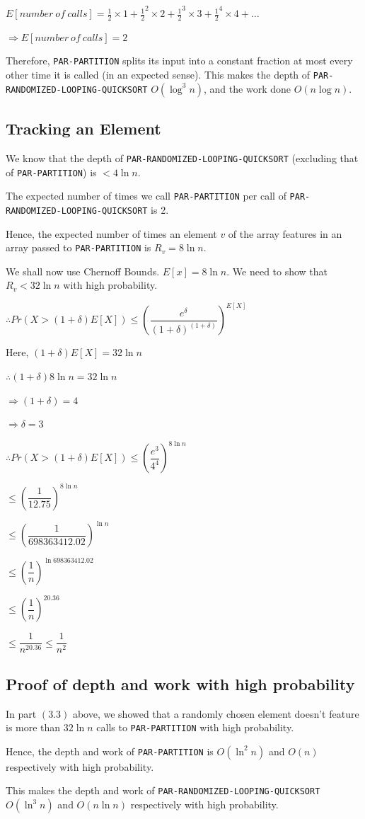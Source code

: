 \documentclass{article}
\begin{document}
$E[number\ of\ calls] = \frac{1}{2} \times 1 + \frac{1}{2}^2 \times 2 +
\frac{1}{2}^3 \times 3 + \frac{1}{2}^4 \times 4 + \ldots$

$\Rightarrow E[number\ of\ calls] = 2$

Therefore, \texttt{PAR-PARTITION} splits its input into a constant
fraction at most every other time it is called (in an expected
sense). This makes the depth of
\texttt{PAR-RANDOMIZED-LOOPING-QUICKSORT} $O(\log^{3}{n})$, and the
work done $O(n\log{n})$.

\subsection{Tracking an Element}

We know that the depth of \texttt{PAR-RANDOMIZED-LOOPING-QUICKSORT}
(excluding that of \texttt{PAR-PARTITION}) is $< 4\ln{n}$.

The expected number of times we call \texttt{PAR-PARTITION} per call
of \texttt{PAR-RANDOMIZED-LOOPING-QUICKSORT} is 2.

Hence, the expected number of times an element $v$ of the array
features in an array passed to \texttt{PAR-PARTITION} is $R_v =
8\ln{n}$.

We shall now use Chernoff Bounds. $E[x] = 8\ln{n}$. We need to show
that $R_v < 32\ln{n}$ with high probability.

$\therefore Pr(X > (1 + \delta)E[X]) \le 
\left(\dfrac{e^\delta}{(1+\delta)^{(1+\delta)}}\right)^{E[X]}$

Here, $(1 + \delta)E[X] = 32\ln{n}$

$\therefore (1+\delta)8\ln{n} = 32\ln{n}$

$\Rightarrow (1+\delta) = 4$

$\Rightarrow \delta = 3$

$\therefore Pr(X > (1 + \delta)E[X]) \le 
\left(\dfrac{e^3}{4^4}\right)^{8\ln{n}}$

$\le \left(\dfrac{1}{12.75}\right)^{8\ln{n}}$

$\le \left(\dfrac{1}{698363412.02}\right)^{\ln{n}}$

$\le \left(\dfrac{1}{n}\right)^{\ln{698363412.02}}$

$\le \left(\dfrac{1}{n}\right)^{20.36}$

$\le \dfrac{1}{n^{20.36}} \le \dfrac{1}{n^{2}}$

\subsection{Proof of depth and work with high probability}

In part $(3.3)$ above, we showed that a randomly chosen element
doesn't feature is more than $32\ln{n}$ calls to
\texttt{PAR-PARTITION} with high probability.

Hence, the depth and work of \texttt{PAR-PARTITION} is $O(\ln^2{n})$
and $O(n)$ respectively with high probability.

This makes the depth and work of
\texttt{PAR-RANDOMIZED-LOOPING-QUICKSORT} $O(\ln^3{n})$ and
$O(n\ln{n})$ respectively with high probability.
\end{document}

